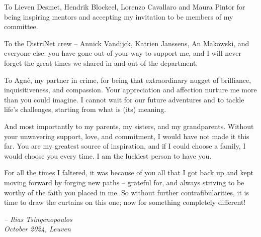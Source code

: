 To Lieven Desmet, Hendrik Blockeel, Lorenzo Cavallaro and Maura Pintor for being inspiring mentors and accepting my invitation to be members of my committee.

To the DistriNet crew -- Annick Vandijck, Katrien Janssens, An Makowski, and everyone else: you have gone out of your way to support me, and I will never forget the great times we shared in and out of the department.

To Agnė, my partner in crime, for being that extraordinary nugget of brilliance, inquisitiveness, and compassion. Your appreciation and affection nurture me more than you could imagine. I cannot wait for our future adventures and to tackle life's challenges, starting from what is (its) meaning.

And most importantly to my parents, my sisters, and my grandparents.
Without your unwavering support, love, and commitment, I would have not made it this far. You are my greatest source of inspiration, and if I could choose a family, I would choose you every time. I am the luckiest person to have you.

For all the times I faltered, it was because of you all that I got back up and kept moving forward by forging new paths -- grateful for, and always striving to be worthy of the faith you placed in me.
So without further contrafibularities, it is time to draw the curtains on this one; now for something completely different!

\begin{flushright}
    \textit{-- Ilias Tsingenopoulos} \\
    \textit{October 2024, Leuven}
\end{flushright}

\cleardoublepage

